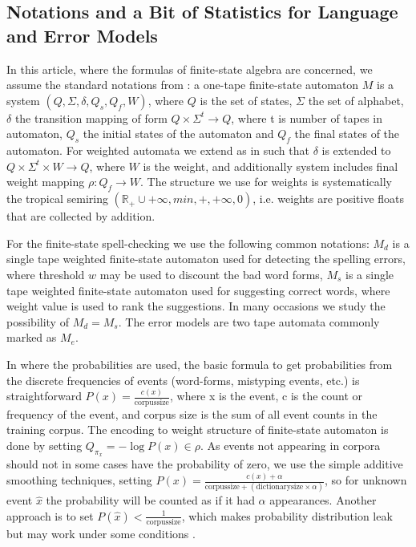 \documentclass[a4paper,12pt]{article}
\begin{document}
\subsection{Notations and a Bit of Statistics for Language and Error Models}
\label{subsec:theory}

In this article, where the formulas of finite-state algebra are concerned, we
assume the standard notations from \cite{aho2007compilers}: a one-tape
finite-state automaton $M$ is a system $(Q, \Sigma, \delta, Q_s, Q_f, W)$,
where $Q$ is the set of states, $\Sigma$ the set of alphabet, $\delta$ the
transition mapping of form $Q \times \Sigma^t \rightarrow Q$, where t is number
of tapes in automaton, $Q_s$ the initial states of the automaton and $Q_f$ the
final states of the automaton. For weighted automata we extend as in
\cite{mohri2009weighted} such that $\delta$ is extended to $Q \times \Sigma^t
\times W \rightarrow Q$, where $W$ is the weight, and additionally system
includes final weight mapping $\rho: Q_f \rightarrow W$. The structure we
use for weights is systematically the tropical semiring 
$(\mathbb{R}_+ \cup {+\infty}, min, +, +\infty, 0)$, i.e. weights are positive
floats that are collected by addition.

For the finite-state spell-checking we use the following common notations:
$M_d$ is a single tape weighted finite-state automaton used for detecting the
spelling errors, where threshold $w$ may be used to discount the bad word
forms, $M_s$ is a single tape weighted finite-state automaton used for
suggesting correct words, where weight value is used to rank the suggestions.
In many occasions we study the possibility of $M_d = M_s$. The error models are
two tape automata commonly marked as $M_e$.

In where the probabilities are used, the basic formula to get probabilities from
the discrete frequencies of events (word-forms, mistyping events, etc.) is
straightforward $P(x) = \frac{c(x)}{\mathrm{corpus size}}$, where x is the
event, c is the count or frequency of the event, and corpus size is the sum of all
event counts in the training corpus. The encoding to weight structure of
finite-state automaton is done by setting $Q_{\pi_x} = -\log P(x) \in \rho$.
As events not appearing in corpora should not in some cases have the probability of
zero, we use the simple additive smoothing techniques, setting $P(x) =
\frac{c(x) + \alpha}{\mathrm{corpus size} + (\mathrm{dictionary size} \times
\alpha)}$, so for unknown event $\hat{x}$ the probability will be counted as if
it had $\alpha$ appearances.  Another approach is to set $P(\hat{x}) <
\frac{1}{\mathrm{corpus size}}$, which makes probability distribution leak but
may work under some conditions \cite[]{brants2007large}.
\end{document}
